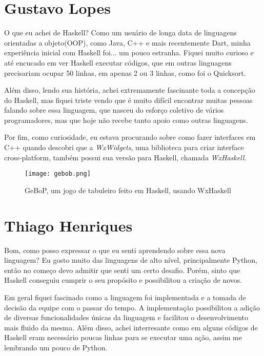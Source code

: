 \begin{apendicesenv}
      
    \partapendices

    \setcounter{chapter}{0}
    \renewcommand{\thechapter}{\Alph{chapter}}%

    \chapter{Gustavo Lopes}

    O que eu achei de Haskell? Como um usuário de longa data de linguagens orientadas a objeto(OOP), 
    como Java, C++ e mais recentemente Dart, minha experiência inicial com Haskell foi...
    um pouco estranha. Fiquei muito curioso e até encucado em ver Haskell executar códigos, que em
    outras linguagens precisariam ocupar 50 linhas, em apenas 2 ou 3 linhas, como foi o Quicksort.

    Além disso, lendo sua história, achei extremamente fascinante toda a concepção do Haskell,
    mas fiquei triste vendo que é muito difícil encontrar muitas pessoas falando sobre essa linguagem, que nasceu 
    do esforço coletivo de vários programadores, mas que hoje não recebe tanto apoio como outras linguagens.

    Por fim, como curiosidade, eu estava procurando sobre como fazer interfaces em C++ quando
    descobri que a \emph{WxWidgets}, uma biblioteca para criar interface cross-platform, também possui 
    sua versão para Haskell, chamada \emph{WxHaskell}.

    \begin{figure}[ht]
      \caption{GeBoP, um jogo de tabuleiro feito em Haskell, usando WxHaskell}
      \texttt{[image: gebob.png]}
    \end{figure}

    \newpage

    \chapter{Thiago Henriques}
    
    Bom, como posso expressar o que eu senti aprendendo sobre essa nova linguagem? Eu gosto muito das linguagens de alto nível, principalmente Python,
    então no começo devo admitir que senti um certo desafio. Porém, sinto que Haskell conseguiu cumprir o 
    seu propósito e possibilitou a criação de novos.

    Em geral fiquei fascinado como a linguagem foi implementada e a tomada de decisão da equipe com o passar do tempo. A implementação
    possibilitou a adição de diversas funcionalidades únicas da linguagem e facilitou o desenvolvimento mais fluido da mesma.
    Além disso, achei interresante como em alguns códigos de Haskell eram necessário poucas linhas para se executar uma ação, assim
    me lembrando um pouco de Python.


\end{apendicesenv}
